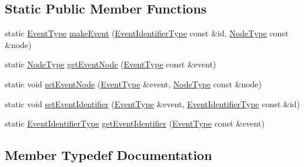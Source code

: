 \subsection*{Static Public Member Functions}
\begin{DoxyCompactItemize}
\item 
static \hyperlink{namespacevt_a009267401def7ae8bf201892222d060f}{Event\+Type} \hyperlink{structvt_1_1event_1_1_event_i_d_manager_a69ba81a6d7adbe78d961057dd9d4a457}{make\+Event} (\hyperlink{namespacevt_1_1event_a0893245b7a220f3fe6951382e3038afa}{Event\+Identifier\+Type} const \&id, \hyperlink{namespacevt_a866da9d0efc19c0a1ce79e9e492f47e2}{Node\+Type} const \&node)
\item 
static \hyperlink{namespacevt_a866da9d0efc19c0a1ce79e9e492f47e2}{Node\+Type} \hyperlink{structvt_1_1event_1_1_event_i_d_manager_a2a422a19489d8410263a39fd2c035732}{get\+Event\+Node} (\hyperlink{namespacevt_a009267401def7ae8bf201892222d060f}{Event\+Type} const \&event)
\item 
static void \hyperlink{structvt_1_1event_1_1_event_i_d_manager_a6da7fb1cb3861a3855bb5d7aeca0caff}{set\+Event\+Node} (\hyperlink{namespacevt_a009267401def7ae8bf201892222d060f}{Event\+Type} \&event, \hyperlink{namespacevt_a866da9d0efc19c0a1ce79e9e492f47e2}{Node\+Type} const \&node)
\item 
static void \hyperlink{structvt_1_1event_1_1_event_i_d_manager_a773f302a16c0b192a3dd13454033f4db}{set\+Event\+Identifier} (\hyperlink{namespacevt_a009267401def7ae8bf201892222d060f}{Event\+Type} \&event, \hyperlink{namespacevt_1_1event_a0893245b7a220f3fe6951382e3038afa}{Event\+Identifier\+Type} const \&id)
\item 
static \hyperlink{namespacevt_1_1event_a0893245b7a220f3fe6951382e3038afa}{Event\+Identifier\+Type} \hyperlink{structvt_1_1event_1_1_event_i_d_manager_aef4daeddf6cf14ab9745bba44f820789}{get\+Event\+Identifier} (\hyperlink{namespacevt_a009267401def7ae8bf201892222d060f}{Event\+Type} const \&event)
\end{DoxyCompactItemize}


\subsection{Member Typedef Documentation}
\mbox{\label{structvt_1_1event_1_1_event_i_d_manager_a24c0cbdfa3e28c477d3f7010c6cba7e2}} 
